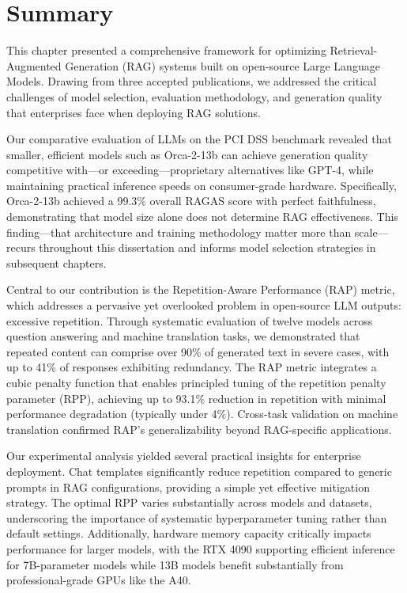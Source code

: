 \section{Summary}

This chapter presented a comprehensive framework for optimizing Retrieval-Augmented Generation (RAG) systems built on open-source Large Language Models. Drawing from three accepted publications, we addressed the critical challenges of model selection, evaluation methodology, and generation quality that enterprises face when deploying RAG solutions.

Our comparative evaluation of LLMs on the PCI DSS benchmark revealed that smaller, efficient models such as Orca-2-13b can achieve generation quality competitive with---or exceeding---proprietary alternatives like GPT-4, while maintaining practical inference speeds on consumer-grade hardware. Specifically, Orca-2-13b achieved a 99.3\% overall RAGAS score with perfect faithfulness, demonstrating that model size alone does not determine RAG effectiveness. This finding---that architecture and training methodology matter more than scale---recurs throughout this dissertation and informs model selection strategies in subsequent chapters.

Central to our contribution is the Repetition-Aware Performance (RAP) metric, which addresses a pervasive yet overlooked problem in open-source LLM outputs: excessive repetition. Through systematic evaluation of twelve models across question answering and machine translation tasks, we demonstrated that repeated content can comprise over 90\% of generated text in severe cases, with up to 41\% of responses exhibiting redundancy. The RAP metric integrates a cubic penalty function that enables principled tuning of the repetition penalty parameter (RPP), achieving up to 93.1\% reduction in repetition with minimal performance degradation (typically under 4\%). Cross-task validation on machine translation confirmed RAP's generalizability beyond RAG-specific applications.

Our experimental analysis yielded several practical insights for enterprise deployment. Chat templates significantly reduce repetition compared to generic prompts in RAG configurations, providing a simple yet effective mitigation strategy. The optimal RPP varies substantially across models and datasets, underscoring the importance of systematic hyperparameter tuning rather than default settings. Additionally, hardware memory capacity critically impacts performance for larger models, with the RTX 4090 supporting efficient inference for 7B-parameter models while 13B models benefit substantially from professional-grade GPUs like the A40.

